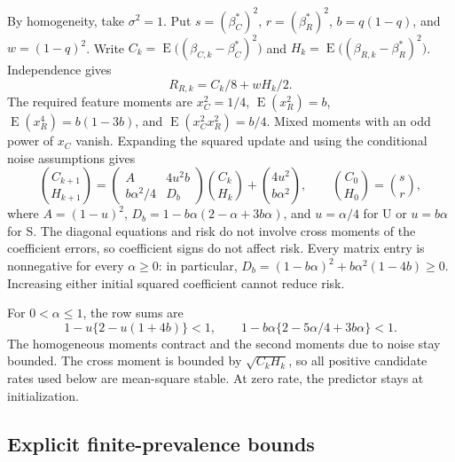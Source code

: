 \documentclass{alt2027}
\DeclareMathOperator{\E}{E}
\begin{document}
By homogeneity, take $\sigma^2 = 1$. Put $s = (\beta_C^*)^2$,
$r = (\beta_R^*)^2$, $b = q(1 - q)$, and $w = (1 - q)^2$. Write
$C_k = \E\bigl((\beta_{C,k} - \beta_C^*)^2\bigr)$ and
$H_k = \E\bigl((\beta_{R,k} - \beta_R^*)^2\bigr)$. Independence gives
\begin{equation}
  R_{R,k} = C_k/8 + wH_k/2.
\end{equation}
The required feature moments are $x_C^2 = 1/4$, $\E(x_R^2) = b$,
$\E(x_R^4) = b(1 - 3b)$, and $\E(x_C^2x_R^2) = b/4$. Mixed moments with an odd
power of $x_C$ vanish. Expanding the squared update and using the conditional
noise assumptions gives
\begin{equation}
  \binom{C_{k+1}}{H_{k+1}} = \begin{pmatrix}
                               A           & 4u^2b \\
                               b\alpha^2/4 & D_b
                             \end{pmatrix}\binom{C_k}{H_k}
                             + \binom{4u^2}{b\alpha^2},\qquad \binom{C_0}{H_0}
                           = \binom{s}{r}, \label{eq:predictive-moments}
\end{equation}
where $A = (1 - u)^2$, $D_b = 1 - b\alpha(2 - \alpha + 3b\alpha)$, and
$u = \alpha/4$ for U or $u = b\alpha$ for S. The diagonal equations and risk do
not involve cross moments of the coefficient errors, so coefficient signs do not
affect risk. Every matrix entry is nonnegative for every $\alpha \geq 0$: in
particular, $D_b = (1 - b\alpha)^2 + b\alpha^2(1 - 4b) \geq 0$. Increasing
either initial squared coefficient cannot reduce risk.

For $0 < \alpha \leq 1$, the row sums are
\[
  1 - u\{2 - u(1 + 4b)\} < 1,\qquad 1 - b\alpha\{2 - 5\alpha/4 + 3b\alpha\} < 1.
\]
The homogeneous moments contract and the second moments due to noise stay
bounded. The cross moment is bounded by $\sqrt{C_kH_k}$, so all positive
candidate rates used below are mean-square stable. At zero rate, the predictor
stays at initialization.

\subsection{Explicit finite-prevalence bounds}
\label{sec:predictive-finite-bounds}
\end{document}
